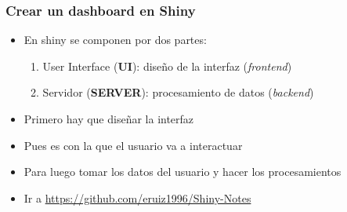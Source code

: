 \begin{frame}
    \frametitle{Crear un dashboard en Shiny}
    \begin{itemize}
        \item<1-> En shiny se componen por dos partes:
        \begin{enumerate}
            \item<2-> User Interface (\textbf{UI}): diseño de la interfaz (\textit{frontend})
            \item<3-> Servidor (\textbf{SERVER}): procesamiento de datos (\textit{backend})
        \end{enumerate}
        \item<4-> Primero hay que diseñar la interfaz
        \item<5-> Pues es con la que el usuario va a interactuar
        \item<6-> Para luego tomar los datos del usuario y hacer los procesamientos
        \item<7-> Ir a \url{https://github.com/eruiz1996/Shiny-Notes}
  \end{itemize}
\end{frame}